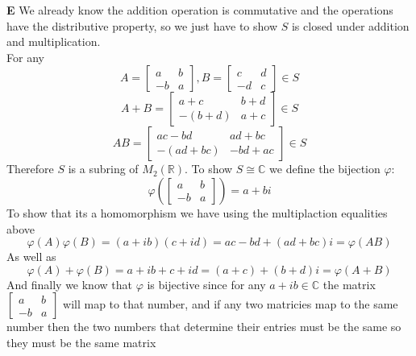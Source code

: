 \documentclass[12pt]{article}
\newenvironment{ques}{\vspace{2 ex}}{\vspace{2 ex}}
\theoremstyle{definition}
\begin{document}
\begin{ques}
	\textbf{E}
	We already know the addition operation is commutative and the
	operations have the distributive property, so we just have
	to show $S$ is closed under addition and multiplication.\\
	For any 
	$$A = \left[\begin{array}{cc} a & b \\ -b & a \end{array}\right], B =
	\left[\begin{array}{cc} c & d\\ -d & c \end{array}\right] \in S$$
	$$A + B = \left[\begin{array}{cc} a + c & b + d\\ -(b + d) & a + c
	\end{array}\right] \in S$$
	$$AB = \left[\begin{array}{cc} ac - bd & ad + bc\\ -(ad + bc) & -bd + ac
	\end{array}\right] \in S$$
	Therefore $S$ is a subring of $M_2(\mathbb R)$. To show $S \cong
	\mathbb C$ we define the bijection $\varphi:$ 
	$$\varphi \left(\left[\begin{array}{cc} a & b\\ -b &
	a\end{array}\right]\right) = a + bi$$
	To show that its a homomorphism we have using the multiplaction
	equalities above
	$$\varphi(A)\varphi(B) = (a + ib)(c + id) = ac - bd + (ad + bc)i = \varphi(AB)$$
	As well as
	$$\varphi(A) + \varphi(B) = a + ib + c + id = (a + c) + (b + d)i =
	\varphi(A + B)$$
	And finally we know that $\varphi$ is bijective since for any $a + ib
	\in \mathbb C$ the matrix $\left[\begin{array}{cc} a & b \\ -b & a
	\end{array}\right]$ will map to that number, and if any two matricies
	map to the same number then the two numbers that determine their
	entries must be the same so they must be the same matrix

\end{ques}
\end{document}
